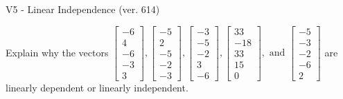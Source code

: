 \begin{exercise}
  \begin{exerciseTitle}V5 - Linear Independence (ver. 614)\end{exerciseTitle}
  \begin{exerciseStatement}
    Explain why the vectors \(\left[\begin{array}{r}
-6 \\
4 \\
-6 \\
-3 \\
3
\end{array}\right] , \left[\begin{array}{r}
-5 \\
2 \\
-5 \\
-2 \\
-3
\end{array}\right] , \left[\begin{array}{r}
-3 \\
-5 \\
-2 \\
3 \\
-6
\end{array}\right] , \left[\begin{array}{r}
33 \\
-18 \\
33 \\
15 \\
0
\end{array}\right] , \text{ and } \left[\begin{array}{r}
-5 \\
-3 \\
-2 \\
-6 \\
2
\end{array}\right]\) are linearly dependent or linearly independent.	



\end{exerciseStatement}
\end{exercise}

